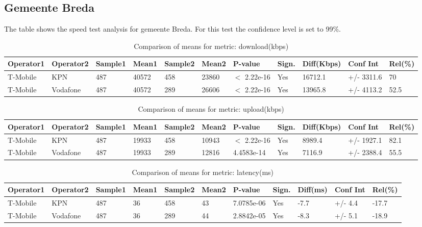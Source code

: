 \documentclass[]{article}
\begin{document}
\normalsize

\newpage

\subsection{Gemeente Breda}\label{gemeente-breda}

The table shows the speed test analysis for gemeente Breda. For this
test the confidence level is set to 99\%.

\begin{table}[ht]
\centering
{\footnotesize
\begin{tabular}{lllllllllll}
  \hline
Operator1 & Operator2 & Sample1 & Mean1 & Sample2 & Mean2 & P-value & Sign. & Diff(Kbps) & Conf Int & Rel(\%) \\ 
  \hline
T-Mobile & KPN & 487 & 40572 & 458 & 23860 & $<$ 2.22e-16 & Yes & 16712.1 & +/- 3311.6 & 70 \\ 
  T-Mobile & Vodafone & 487 & 40572 & 289 & 26606 & $<$ 2.22e-16 & Yes & 13965.8 & +/- 4113.2 & 52.5 \\ 
   \hline
\end{tabular}
}
\caption{Comparison of means for metric: download(kbps)} 
\end{table}\begin{table}[ht]
\centering
{\footnotesize
\begin{tabular}{lllllllllll}
  \hline
Operator1 & Operator2 & Sample1 & Mean1 & Sample2 & Mean2 & P-value & Sign. & Diff(Kbps) & Conf Int & Rel(\%) \\ 
  \hline
T-Mobile & KPN & 487 & 19933 & 458 & 10943 & $<$ 2.22e-16 & Yes & 8989.4 & +/- 1927.1 & 82.1 \\ 
  T-Mobile & Vodafone & 487 & 19933 & 289 & 12816 & 4.4583e-14 & Yes & 7116.9 & +/- 2388.4 & 55.5 \\ 
   \hline
\end{tabular}
}
\caption{Comparison of means for metric: upload(kbps)} 
\end{table}\begin{table}[ht]
\centering
{\footnotesize
\begin{tabular}{lllllllllll}
  \hline
Operator1 & Operator2 & Sample1 & Mean1 & Sample2 & Mean2 & P-value & Sign. & Diff(ms) & Conf Int & Rel(\%) \\ 
  \hline
T-Mobile & KPN & 487 & 36 & 458 & 43 & 7.0785e-06 & Yes & -7.7 & +/- 4.4 & -17.7 \\ 
  T-Mobile & Vodafone & 487 & 36 & 289 & 44 & 2.8842e-05 & Yes & -8.3 & +/- 5.1 & -18.9 \\ 
   \hline
\end{tabular}
}
\caption{Comparison of means for metric: latency(ms)} 
\end{table}
\end{document}
